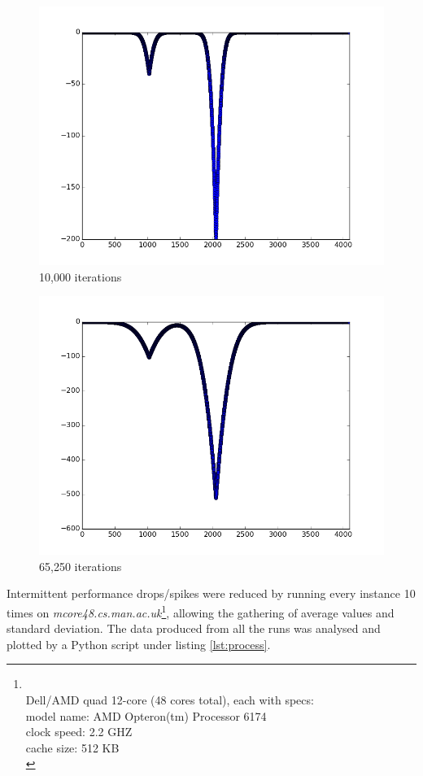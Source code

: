 \documentclass{article}
\begin{document}
\begin{figure}
\begin{minipage}{0.45\textwidth}
  \includegraphics[width=1\linewidth, natwidth=800, natheight=600]{graphs/it10000.png}\\
  10,000 iterations
\end{minipage}
\begin{minipage}{0.45\textwidth}
  \centering
  \includegraphics[width=1\linewidth, natwidth=800, natheight=600]{graphs/itFinal.png}\\
  65,250 iterations
\end{minipage}
\end{figure}	

Intermittent performance drops/spikes were reduced by running every instance 10 times on \textit{mcore48.cs.man.ac.uk}\footnote{\label{machinespecs} \\
  Dell/AMD quad 12-core (48 cores total), each with specs:\\
  model name: AMD Opteron(tm) Processor 6174 \\
  clock speed: 2.2 GHZ \\
  cache size: 512 KB \\}, allowing the gathering of average values and standard deviation. The data produced from all the runs was analysed and plotted by a Python script under listing \ref{lst:process}.
\end{document}
